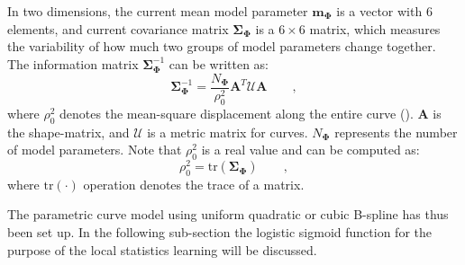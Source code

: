 \documentclass[conference]{IEEEtran}
\begin{document}
In two dimensions, the current mean model parameter
$\mathbf{m}_{\mathbf{\Phi}}$ is a vector with $6$ elements, and current
covariance matrix $\mathbf{\Sigma}_{\mathbf{\Phi}}$ is a $6 \times 6$ matrix, which measures the variability of
how much two groups of model parameters change together. The
information matrix $\mathbf{\Sigma}_{\mathbf{\Phi}}^{-1}$ can be
written as:
\begin{equation}
  \label{eq:infomatrix}
  \mathbf{\Sigma}_{\mathbf{\Phi}}^{-1} = \frac{N_{\mathbf{\Phi}}}{\rho_0^2} \mathbf{A}^T\mathcal{U}\mathbf{A}\qquad,
\end{equation}
where $\rho_0^2$ denotes the mean-square displacement along the entire
curve (\cite{blake1998active}). $\mathbf{A}$ is the shape-matrix, and $\mathcal{U}$ is
a metric matrix for curves. $N_{\mathbf{\Phi}}$ represents
the number of model parameters. Note that $\rho_0^2$
is a real value and can be computed as:
\begin{equation}
  \label{eq:trace}
  \rho_0^2 = \mathrm{tr}(\mathbf{\Sigma}_{\mathbf{\Phi}})\qquad,
\end{equation}
where $\mathrm{tr}(\cdot)$ operation denotes the trace of a matrix.

The parametric curve model using uniform quadratic or
cubic B-spline has thus been set up. In the following sub-section the
logistic sigmoid function for the purpose of the local statistics learning 
will be discussed.
\end{document}
